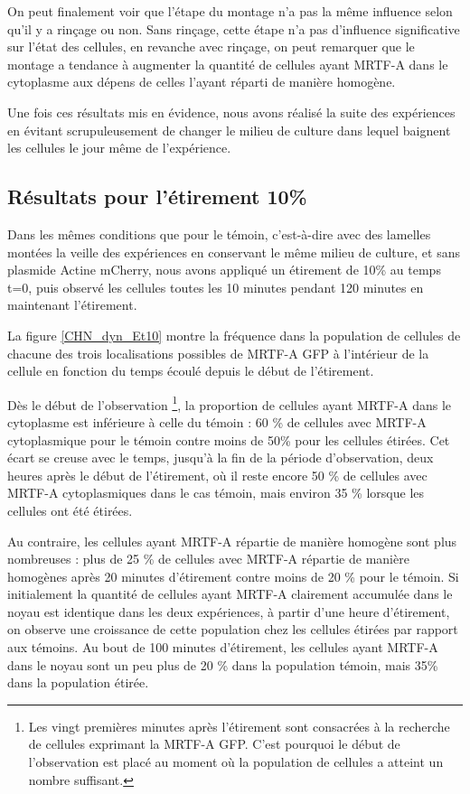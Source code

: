 \documentclass{report}
\begin{document}
On peut finalement voir que l'étape du montage n'a pas la même influence selon qu'il y a rinçage ou non. Sans rinçage, cette étape n'a pas d'influence significative sur l'état des cellules, en revanche avec rinçage, on peut remarquer que le montage a tendance à augmenter la quantité de cellules ayant MRTF-A dans le cytoplasme aux dépens de celles l'ayant réparti de manière homogène. 

Une fois ces résultats mis en évidence, nous avons réalisé la suite des expériences en évitant scrupuleusement de changer le milieu de culture dans lequel baignent les cellules le jour même de l'expérience. 

\subsection{Résultats pour l'étirement 10\%}

Dans les mêmes conditions que pour le témoin, c'est-à-dire avec des lamelles montées la veille des expériences en conservant le même milieu de culture, et sans plasmide Actine mCherry, nous avons appliqué un étirement de 10\% au temps t=0, puis observé les cellules toutes les 10 minutes pendant 120 minutes en maintenant l'étirement. 

La figure \ref{CHN_dyn_Et10} montre la fréquence dans la population de cellules de chacune des trois localisations possibles de MRTF-A GFP à l'intérieur de la cellule en fonction du temps écoulé depuis le début de l'étirement. 
 
Dès le début de l'observation \footnote{Les vingt premières minutes après l'étirement sont consacrées à la recherche de cellules exprimant la MRTF-A GFP. C'est pourquoi le début de l'observation est placé au moment où la population de cellules a atteint un nombre suffisant.}, la proportion de cellules ayant MRTF-A dans le cytoplasme est inférieure à celle du témoin : 60 \% de cellules avec MRTF-A cytoplasmique pour le témoin contre moins de 50\% pour les cellules étirées. Cet écart se creuse avec le temps, jusqu'à la fin de la période d'observation, deux heures après le début de l'étirement, où il reste encore 50 \% de cellules avec MRTF-A cytoplasmiques dans le cas témoin, mais environ 35 \% lorsque les cellules ont été étirées. 

Au contraire, les cellules ayant MRTF-A répartie de manière homogène sont plus nombreuses : plus de 25 \% de cellules avec MRTF-A répartie de manière homogènes après 20 minutes d'étirement contre moins de 20  \% pour le témoin. 
Si initialement la quantité de cellules ayant MRTF-A clairement accumulée dans le noyau est identique dans les deux expériences, à partir d'une heure d'étirement, on observe une croissance de cette population chez les cellules étirées par rapport aux témoins. Au bout de 100 minutes d'étirement, les cellules ayant MRTF-A dans le noyau sont un peu plus de 20 \% dans la population témoin, mais 35\% dans la population étirée. 
\end{document}
